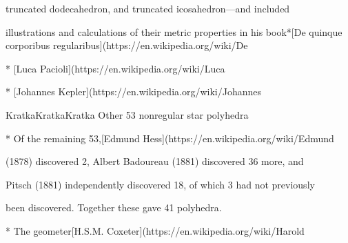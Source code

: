 truncated dodecahedron, and truncated icosahedron—and included

illustrations and calculations of their metric properties in his book*[De quinque corporibus regularibus](https://en.wikipedia.org/wiki/De%

* [Luca Pacioli](https://en.wikipedia.org/wiki/Luca%

* [Johannes Kepler](https://en.wikipedia.org/wiki/Johannes%

KratkaKratkaKratka Other 53 nonregular star polyhedra

* Of the remaining 53,[Edmund Hess](https://en.wikipedia.org/wiki/Edmund%

(1878) discovered 2, Albert Badoureau (1881) discovered 36 more, and

Pitsch (1881) independently discovered 18, of which 3 had not previously

been discovered. Together these gave 41 polyhedra.

* The geometer[H.S.M. Coxeter](https://en.wikipedia.org/wiki/Harold%

